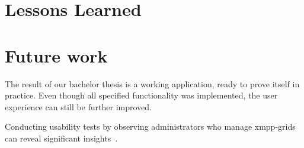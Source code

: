 \section{Lessons Learned}






\section{Future work}
The result of our bachelor thesis is a working application, ready to prove itself in practice.
Even though all specified functionality was implemented, the user experience can still be further improved.

Conducting usability tests by observing administrators who manage \glspl{xmpp-grid} can reveal significant insights~\cite{krug:dont-make-me-think}.

